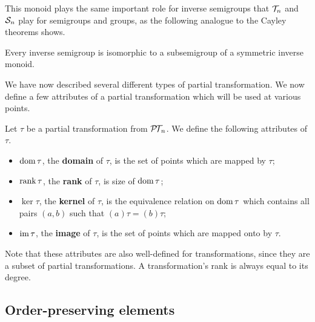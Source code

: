 This monoid plays the same important role for inverse semigroups that $\mathcal{T}_n$ and
$\mathcal{S}_n$ play for semigroups and groups, as the following analogue to the Cayley
theorems shows.

\begin{theorem}
  \label{thm:wagner-preston}
  Every inverse semigroup is isomorphic to a subsemigroup of a symmetric inverse
  monoid.
\end{theorem}

We have now described several different types of partial transformation.  We now
define a few attributes of a partial transformation which will be used at
various points.

\begin{definition}
  Let $\tau$ be a partial transformation from $\mathcal{P\!T\!}_n$.  We define the following
  attributes of $\tau$.
  \begin{itemize}
  \item $\operatorname{dom} \tau$, the \textbf{domain} of $\tau$, is the set of points which
    are mapped by $\tau$;
  \item $\operatorname{rank} \tau$, the \textbf{rank} of $\tau$, is size of $\operatorname{dom} \tau$;
  \item $\ker \tau$, the \textbf{kernel} of $\tau$, is the equivalence relation
    on $\operatorname{dom} \tau$ which contains all pairs $(a,b)$ such that
    $(a)\tau = (b)\tau$;
  \item $\operatorname{im} \tau$, the \textbf{image} of $\tau$, is the set of points which are
    mapped onto by $\tau$.
  \end{itemize}
\end{definition}

Note that these attributes are also well-defined for transformations, since they
are a subset of partial transformations.  A transformation's rank is always
equal to its degree.

\subsection{Order-preserving elements}
\label{sec:order-preserving}

